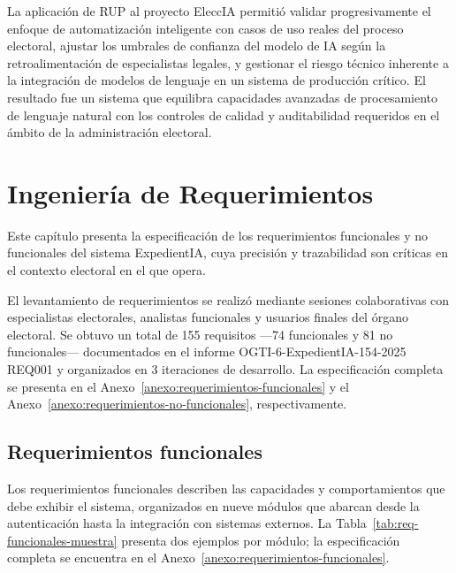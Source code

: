 \documentclass[12pt,a4paper,oneside]{book}
\begin{document}
La aplicación de RUP al proyecto EleccIA permitió validar progresivamente el enfoque de automatización inteligente con casos de uso reales del proceso electoral, ajustar los umbrales de confianza del modelo de IA según la retroalimentación de especialistas legales, y gestionar el riesgo técnico inherente a la integración de modelos de lenguaje en un sistema de producción crítico. El resultado fue un sistema que equilibra capacidades avanzadas de procesamiento de lenguaje natural con los controles de calidad y auditabilidad requeridos en el ámbito de la administración electoral.

\chapter{Ingeniería de Requerimientos}
\label{cap:requerimientos}

Este capítulo presenta la especificación de los requerimientos funcionales y no funcionales del sistema ExpedientIA, cuya precisión y trazabilidad son críticas en el contexto electoral en el que opera.

El levantamiento de requerimientos se realizó mediante sesiones colaborativas con especialistas electorales, analistas funcionales y usuarios finales del órgano electoral. Se obtuvo un total de 155 requisitos —74 funcionales y 81 no funcionales— documentados en el informe OGTI-6-ExpedientIA-154-2025 REQ001 y organizados en 3 iteraciones de desarrollo. La especificación completa se presenta en el Anexo~\ref{anexo:requerimientos-funcionales} y el Anexo~\ref{anexo:requerimientos-no-funcionales}, respectivamente.

\section{Requerimientos funcionales}
\label{sec:req-funcionales}

Los requerimientos funcionales describen las capacidades y comportamientos que debe exhibir el sistema, organizados en nueve módulos que abarcan desde la autenticación hasta la integración con sistemas externos. La Tabla~\ref{tab:req-funcionales-muestra} presenta dos ejemplos por módulo; la especificación completa se encuentra en el Anexo~\ref{anexo:requerimientos-funcionales}.
\end{document}
